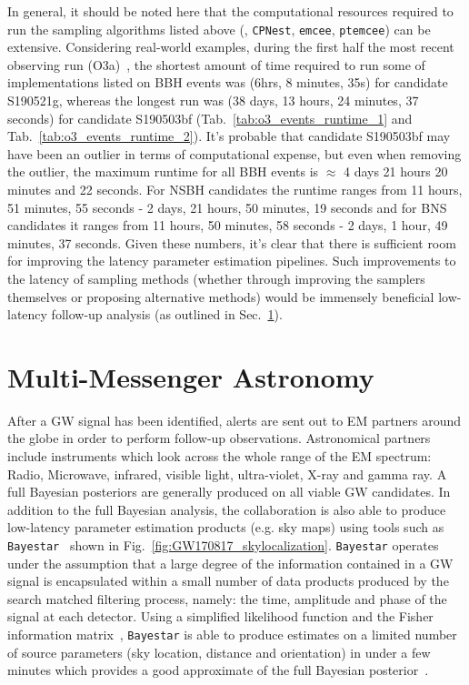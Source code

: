 %
%
In general, it should be noted here that the computational resources 
required to run the sampling algorithms listed above (, 
\texttt{CPNest}, \texttt{emcee}, \texttt{ptemcee}) can be 
extensive. Considering real-world examples, during the 
first half the most recent observing 
run (O3a)~\cite{gracedb_O3}, the shortest amount of time required 
to run some of 
implementations listed on \ac{BBH} events was (6hrs, 8 minutes, 35s) for 
candidate S190521g, whereas the longest run was (38 days, 13 hours, 
24 minutes, 37 seconds) for candidate S190503bf
(Tab.~\ref{tab:o3_events_runtime_1} 
and Tab.~\ref{tab:o3_events_runtime_2}). It's probable that 
candidate S190503bf may have been an outlier in terms of computational 
expense, but even when removing the outlier, the maximum runtime 
for all \ac{BBH} events is $\approx$ 4 days 21 hours 20 minutes and 
22 seconds. For \ac{NSBH} candidates the runtime ranges from 11 hours, 
51 minutes, 55 seconds - 2 days, 21 hours, 50 minutes, 19 seconds and 
for \ac{BNS} candidates it ranges from 11 hours, 50 minutes, 58 
seconds - 2 days, 1 hour, 49 minutes, 37 seconds. Given these
numbers, it's clear that there is sufficient 
room for improving the latency parameter estimation pipelines. Such 
improvements to the latency of sampling methods (whether through 
improving the samplers themselves or proposing alternative methods) would 
be immensely beneficial low-latency follow-up analysis (as outlined in 
Sec.~\ref{sec:multi-messenger}).

\section{Multi-Messenger Astronomy}\label{sec:multi-messenger}

After a \ac{GW} signal has been identified, alerts are sent out to 
\ac{EM} partners around the globe in order to perform follow-up 
observations. Astronomical partners include 
instruments which look across 
the whole range of the \ac{EM} spectrum: Radio, Microwave, 
infrared, visible light, ultra-violet, X-ray and gamma ray. A full Bayesian 
posteriors are generally produced on all viable \ac{GW} candidates. In 
addition to the full Bayesian analysis, the collaboration 
is also able to produce 
low-latency parameter estimation products (e.g. sky maps) using tools such 
as \texttt{Bayestar}~\cite{2016PhRvD..93b4013S} shown in
Fig.~\ref{fig:GW170817_skylocalization}. \texttt{Bayestar} operates
under the assumption that a large degree of the information contained in a 
\ac{GW} signal is encapsulated within a small number of data 
products produced by the 
search matched filtering process, namely: the time, amplitude and 
phase of the signal at 
each detector. Using a simplified likelihood function and the 
Fisher information matrix~\cite{2017arXiv170501064L}, 
\texttt{Bayestar} is able to produce estimates 
on a limited number of source parameters 
(sky location, distance and orientation) in 
under a few minutes which provides a good approximate of the full 
Bayesian posterior~\cite{2014ApJ...795..105S}.

